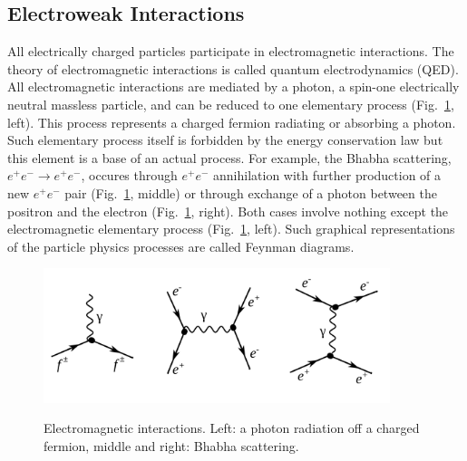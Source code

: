\subsection{Electroweak Interactions}
\label{sec:Intro_Electroweak}

All electrically charged particles participate in electromagnetic interactions. The theory of electromagnetic interactions is called quantum electrodynamics (QED). All electromagnetic interactions are mediated by a photon, a spin-one electrically neutral massless particle, and can be reduced to one elementary process (Fig.~\ref{fig:feynmEM}, left). This process represents a charged fermion radiating or absorbing a photon. Such elementary process itself is forbidden by the energy conservation law but this element is a base of an actual process. For example, the Bhabha scattering, $e^+e^- \rightarrow e^+e^-$, occures through $e^+e^-$ annihilation with further production of a new $e^+e^-$ pair (Fig.~\ref{fig:feynmEM}, middle) or through exchange of a photon between the positron and the electron (Fig.~\ref{fig:feynmEM}, right). Both cases involve nothing except the electromagnetic elementary process (Fig.~\ref{fig:feynmEM}, left). Such graphical representations of the particle physics processes are called Feynman diagrams.\\ 

\begin{figure}[htb]
  \begin{center}
    {\includegraphics[width=0.90\textwidth]{../figs/Intro/feynmEM.png}}
    \caption{Electromagnetic interactions. Left: a photon radiation off a charged fermion, middle and right: Bhabha scattering. }
    \label{fig:feynmEM}
  \end{center}
\end{figure}

